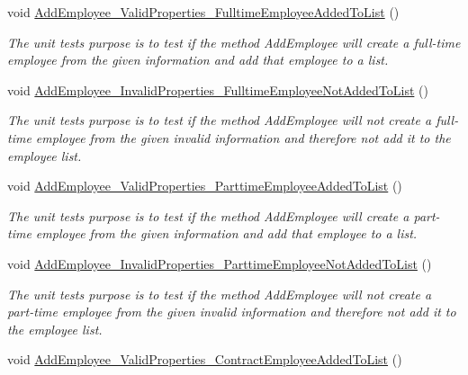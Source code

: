 \begin{DoxyCompactItemize}
void \hyperlink{class_the_company_1_1_tests_1_1_add_employee_tests_a91a0e2595bad9bdf615e50c7b75ebdf7}{Add\+Employee\+\_\+\+Valid\+Properties\+\_\+\+Fulltime\+Employee\+Added\+To\+List} ()
\begin{DoxyCompactList}\small\item\em The unit test\textquotesingle{}s purpose is to test if the method Add\+Employee will create a full-\/time employee from the given information and add that employee to a list. \end{DoxyCompactList}\item 
void \hyperlink{class_the_company_1_1_tests_1_1_add_employee_tests_af781266ccde824a6f42ee4695356dc6c}{Add\+Employee\+\_\+\+Invalid\+Properties\+\_\+\+Fulltime\+Employee\+Not\+Added\+To\+List} ()
\begin{DoxyCompactList}\small\item\em The unit test\textquotesingle{}s purpose is to test if the method Add\+Employee will not create a full-\/time employee from the given invalid information and therefore not add it to the employee list. \end{DoxyCompactList}\item 
void \hyperlink{class_the_company_1_1_tests_1_1_add_employee_tests_ab70c02349350d6afcd78c8d85b4bba05}{Add\+Employee\+\_\+\+Valid\+Properties\+\_\+\+Parttime\+Employee\+Added\+To\+List} ()
\begin{DoxyCompactList}\small\item\em The unit test\textquotesingle{}s purpose is to test if the method Add\+Employee will create a part-\/time employee from the given information and add that employee to a list. \end{DoxyCompactList}\item 
void \hyperlink{class_the_company_1_1_tests_1_1_add_employee_tests_ace4225c2678e8613cf361e8e4a9d3c12}{Add\+Employee\+\_\+\+Invalid\+Properties\+\_\+\+Parttime\+Employee\+Not\+Added\+To\+List} ()
\begin{DoxyCompactList}\small\item\em The unit test\textquotesingle{}s purpose is to test if the method Add\+Employee will not create a part-\/time employee from the given invalid information and therefore not add it to the employee list. \end{DoxyCompactList}\item 
void \hyperlink{class_the_company_1_1_tests_1_1_add_employee_tests_a075fdfefdfc404f59b2aa6da94963358}{Add\+Employee\+\_\+\+Valid\+Properties\+\_\+\+Contract\+Employee\+Added\+To\+List} ()

\end{DoxyCompactItemize}
